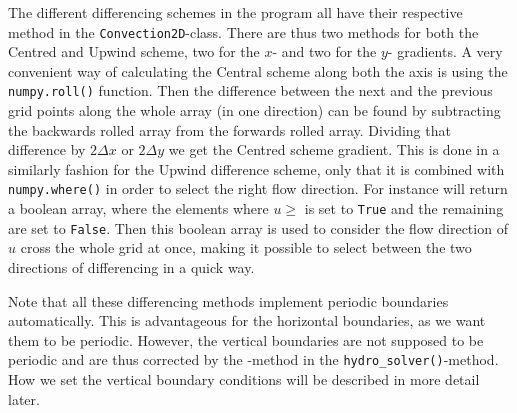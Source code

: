 \documentclass{emulateapj}
\begin{document}
	The different differencing schemes in the program all have their respective method in the \texttt{Convection2D}-class. There are thus two methods for both the Centred and Upwind scheme, two for the $x$- and two for the $y$- gradients. A very convenient way of calculating the Central scheme along both the axis is using the \texttt{numpy.roll()} function. Then the difference between the next and the previous grid points along the whole array (in one direction) can be found by subtracting the backwards rolled array from the forwards rolled array. Dividing that difference by $2\Delta x$ or $2\Delta y$ we get the Centred scheme gradient. This is done in a similarly fashion for the Upwind difference scheme, only that it is combined with \texttt{numpy.where()} in order to select the right flow direction. For instance  will return a boolean array, where the elements where $u\geq$ is set to \texttt{True} and the remaining are set to \texttt{False}. Then this boolean array is used to consider the flow direction of $u$ cross the whole grid at once, making it possible to select between the two directions of differencing in a quick way. 
	
	Note that all these differencing methods implement periodic boundaries automatically. This is advantageous for the horizontal boundaries, as we want them to be periodic. However, the vertical boundaries are not supposed to be periodic and are thus corrected by the -method in the \texttt{hydro\_solver()}-method. How we set the vertical boundary conditions will be described in more detail later. 
		
\end{document}
